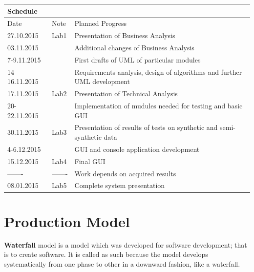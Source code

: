 \documentclass{article}
\begin{document}
\begin{center}


\begin{table}[h]

\large
\begin{tabular}{|l|l|l|}
\hline
\multicolumn{3}{|l|}{\cellcolor[HTML]{C0C0C0}Schedule} \\ \hline
Date         & Note        & Planned Progress          \\ \hline
\hline

27.10.2015   & Lab1    & Presentation of Business Analysis   \\ \hline
03.11.2015   &    & Additional changes of Business Analysis   \\ \hline
7-9.11.2015   &     & First drafts of UML of particular modules   \\ \hline
14-16.11.2015   &     & Requirements analysis, design of algorithms and further UML development \\ \hline
17.11.2015   &  Lab2   & Presentation of Technical Analysis   \\ \hline
20-22.11.2015   &     & Implementation of mudules needed for testing and basic GUI   \\ \hline
30.11.2015   & Lab3    & Presentation of results of tests on synthetic and semi-synthetic data  \\ \hline
4-6.12.2015   &     & GUI and console application development  \\ \hline
15.12.2015   & Lab4    & Final GUI  \\ \hline
-------  & -------    & Work depends on acquired results  \\ \hline
08.01.2015  & Lab5    & Complete system presentation  \\ \hline
\end{tabular}
\end{table}

\end{center}


\newpage




\section{Production Model}
{\bf Waterfall} model is a model which was developed for software development; that is to create software. It is called as such because the model develops systematically from one phase to other in a downward fashion, like a waterfall.
\end{document}
